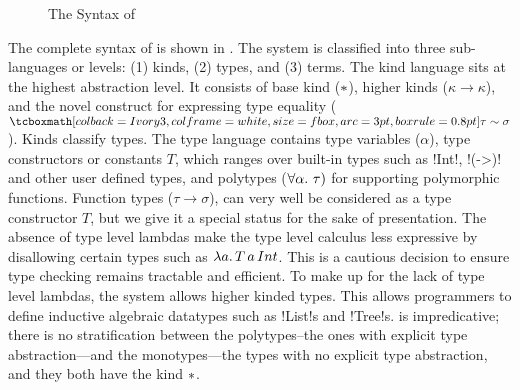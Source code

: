 \documentclass[screen,nonacm,manuscript,review]{acmart} %
\begin{document}
\begin{figure}[ht]
 \caption{The Syntax of \SFC}
 \label{fig:sfc-syntax}
\end{figure}

The complete syntax of \SFC is shown in . The
system is classified into three sub-languages or levels: (1) kinds,
(2) types, and (3) terms. The kind language sits at the highest
abstraction level. It consists of base kind ($\ast$), higher kinds
($\kappa \to \kappa$), and the novel construct for expressing type
equality ($\shl{\tau \sim \sigma}$). Kinds classify types. The type
language contains type variables ($\alpha$), type constructors or
constants $T$, which ranges over built-in types such as !Int!, !(->)!
and other user defined types, and polytypes ($\forall\alpha.~\tau)$
for supporting polymorphic functions. Function types ($\tau \to
\sigma$), can very well be considered as a type constructor $T$, but
we give it a special status for the sake of presentation. The absence
of type level lambdas make the type level calculus less expressive by
disallowing certain types such as $\lambda a.\, T\, a\, Int$. This is
a cautious decision to ensure type checking remains tractable and
efficient. To make up for the lack of type level lambdas, the system
allows higher kinded types. This allows programmers to define
inductive algebraic datatypes such as !List!s and !Tree!s. \SFC is
impredicative; there is no stratification between the polytypes--the
ones with explicit type abstraction---and
the monotypes---the types with no explicit type abstraction, and they
both have the kind $\ast$.
\end{document}
